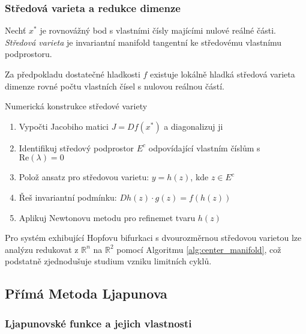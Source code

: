 \subsubsection{Středová varieta a redukce dimenze}

\begin{definition}
Nechť $x^*$ je rovnovážný bod s vlastními čísly majícími nulové reálné části. \emph{Středová varieta} je invariantní manifold tangentní ke středovému vlastnímu podprostoru.
\end{definition}

\begin{theorem}
Za předpokladu dostatečné hladkosti $f$ existuje lokálně hladká středová varieta dimenze rovné počtu vlastních čísel s nulovou reálnou částí.
\end{theorem}

\begin{algorithm}[ht]
\caption{Numerická konstrukce středové variety}
\label{alg:center_manifold}
\begin{enumerate}
\item Vypočti Jacobiho matici $J = Df(x^*)$ a diagonalizuj ji
\item Identifikuj středový podprostor $E^c$ odpovídající vlastním číslům s $\mathrm{Re}(\lambda) = 0$
\item Polož ansatz pro středovou varietu: $y = h(z)$, kde $z \in E^c$
\item Řeš invariantní podmínku: $Dh(z) \cdot g(z) = f(h(z))$
\item Aplikuj Newtonovu metodu pro refinemet tvaru $h(z)$
\end{enumerate}
\end{algorithm}

\begin{application}
Pro systém exhibující Hopfovu bifurkaci s dvourozměrnou středovou varietou lze analýzu redukovat z $\mathbb{R}^n$ na $\mathbb{R}^2$ pomocí Algoritmu \ref{alg:center_manifold}, což podstatně zjednodušuje studium vzniku limitních cyklů.
\end{application}

\spc

\subsection{Přímá Metoda Ljapunova}

\subsubsection{Ljapunovské funkce a jejich vlastnosti}

